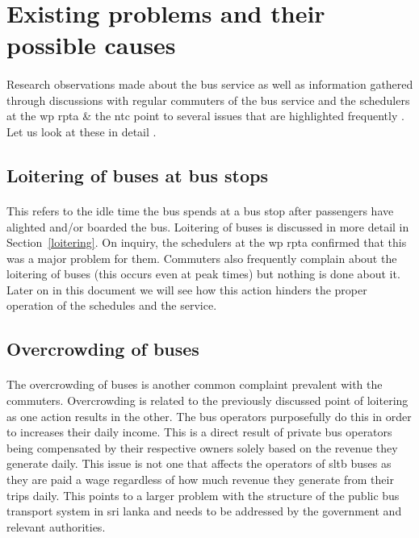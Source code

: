 \section{Existing problems and their possible causes}
\label{section-ExistingProblems}

\paragraph{} Research observations made about the bus service as well as information gathered through discussions with regular commuters of the bus service and the schedulers at the \acrshort{wp} \acrshort{rpta} \& the \acrshort{ntc} point to several issues that are highlighted frequently . Let us look at these in detail \cite{Wickremasekara2012, Range2012, Mahesh2013a, Theja2013a, Mahesh2013b, Navaratne2013a, Navaratne2013b, Bandara2013, DeSilva2013, Senevirathne2013, Pallegoda2013}.

\subsection{Loitering of buses at bus stops}

\paragraph{} This refers to the idle time the bus spends at a bus stop after passengers have alighted and/or boarded the bus. Loitering of buses is discussed in more detail in Section~\ref{loitering}. On inquiry, the schedulers at the \acrshort{wp} \acrshort{rpta} confirmed that this was a major problem for them. Commuters also frequently complain about the loitering of buses (this occurs even at peak times) but nothing is done about it. Later on in this document we will see how this action hinders the proper operation of the schedules and the service.

\subsection{Overcrowding of buses}

\paragraph{} The overcrowding of buses is another common complaint prevalent with the commuters. Overcrowding is related to the previously discussed point of loitering as one action results in the other. The bus operators purposefully do this in order to increases their daily income. This is a direct result of private bus operators being compensated by their respective owners solely based on the revenue they generate daily. This issue is not one that affects the operators of \acrshort{sltb} buses as they are paid a wage regardless of how much revenue they generate from their trips daily. This points to a larger problem with the structure of the public bus transport system in sri lanka and needs to be addressed by the government and relevant authorities.

